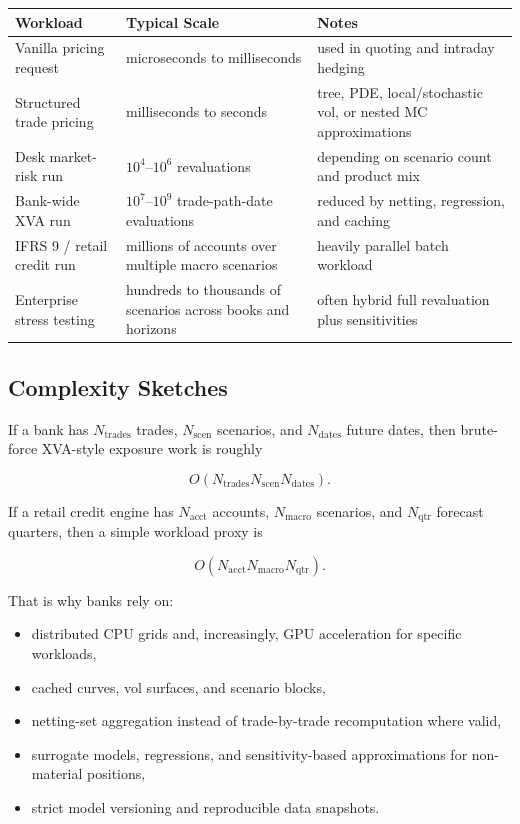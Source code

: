 \documentclass{apex_mdd}
\begin{document}
\begin{center}
\small
\begin{tabular}{p{} p{} p{}}
\toprule
\textbf{Workload} & \textbf{Typical Scale} & \textbf{Notes} \\
\midrule
Vanilla pricing request & microseconds to milliseconds & used in quoting and intraday hedging \\
Structured trade pricing & milliseconds to seconds & tree, PDE, local/stochastic vol, or nested MC approximations \\
Desk market-risk run & $10^4$--$10^6$ revaluations & depending on scenario count and product mix \\
Bank-wide XVA run & $10^7$--$10^9$ trade-path-date evaluations & reduced by netting, regression, and caching \\
IFRS 9 / retail credit run & millions of accounts over multiple macro scenarios & heavily parallel batch workload \\
Enterprise stress testing & hundreds to thousands of scenarios across books and horizons & often hybrid full revaluation plus sensitivities \\
\bottomrule
\end{tabular}
\end{center}

\subsection{Complexity Sketches}

If a bank has $N_{\mathrm{trades}}$ trades, $N_{\mathrm{scen}}$ scenarios, and $N_{\mathrm{dates}}$ future dates, then brute-force XVA-style exposure work is roughly
\begin{formulabox}
\[
  O(N_{\mathrm{trades}}N_{\mathrm{scen}}N_{\mathrm{dates}}).
\]
\end{formulabox}

If a retail credit engine has $N_{\mathrm{acct}}$ accounts, $N_{\mathrm{macro}}$ scenarios, and $N_{\mathrm{qtr}}$ forecast quarters, then a simple workload proxy is
\begin{formulabox}
\[
  O(N_{\mathrm{acct}}N_{\mathrm{macro}}N_{\mathrm{qtr}}).
\]
\end{formulabox}

That is why banks rely on:
\begin{itemize}
  \item distributed CPU grids and, increasingly, GPU acceleration for specific workloads,
  \item cached curves, vol surfaces, and scenario blocks,
  \item netting-set aggregation instead of trade-by-trade recomputation where valid,
  \item surrogate models, regressions, and sensitivity-based approximations for non-material positions,
  \item strict model versioning and reproducible data snapshots.
\end{itemize}
\end{document}

